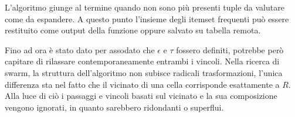L'algoritmo giunge al termine quando non sono più presenti tuple da valutare come da espandere.
A questo punto l'insieme degli itemset frequenti può essere restituito come output della funzione oppure salvato su tabella remota.

Fino ad ora è stato dato per assodato che \(\epsilon\) e \(\tau\) fossero definiti, potrebbe però capitare di rilassare contemporaneamente entrambi i vincoli.
Nella ricerca di swarm, la struttura dell'algoritmo non subisce radicali trasformazioni, l'unica differenza sta nel fatto che il vicinato di una cella corrisponde esattamente a \(R\).
Alla luce di ciò i passaggi e vincoli basati sul vicinato e la sua composizione vengono ignorati, in quanto sarebbero ridondanti o superflui.